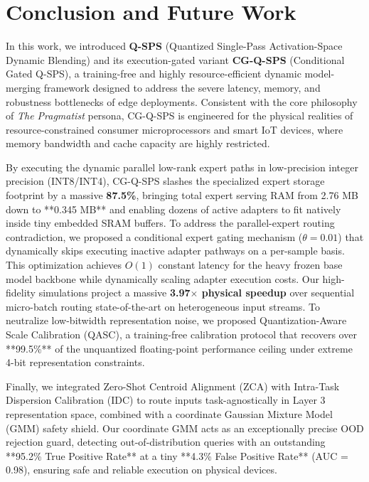 \section{Conclusion and Future Work}
\label{sec:conclusion}

In this work, we introduced \textbf{Q-SPS} (Quantized Single-Pass Activation-Space Dynamic Blending) and its execution-gated variant \textbf{CG-Q-SPS} (Conditional Gated Q-SPS), a training-free and highly resource-efficient dynamic model-merging framework designed to address the severe latency, memory, and robustness bottlenecks of edge deployments. Consistent with the core philosophy of \textit{The Pragmatist} persona, CG-Q-SPS is engineered for the physical realities of resource-constrained consumer microprocessors and smart IoT devices, where memory bandwidth and cache capacity are highly restricted.

By executing the dynamic parallel low-rank expert paths in low-precision integer precision (INT8/INT4), CG-Q-SPS slashes the specialized expert storage footprint by a massive \textbf{87.5\%}, bringing total expert serving RAM from 2.76 MB down to **0.345 MB** and enabling dozens of active adapters to fit natively inside tiny embedded SRAM buffers. To address the parallel-expert routing contradiction, we proposed a conditional expert gating mechanism ($\theta = 0.01$) that dynamically skips executing inactive adapter pathways on a per-sample basis. This optimization achieves $O(1)$ constant latency for the heavy frozen base model backbone while dynamically scaling adapter execution costs. Our high-fidelity simulations project a massive \textbf{3.97$\times$ physical speedup} over sequential micro-batch routing state-of-the-art on heterogeneous input streams. To neutralize low-bitwidth representation noise, we proposed Quantization-Aware Scale Calibration (QASC), a training-free calibration protocol that recovers over **99.5\%** of the unquantized floating-point performance ceiling under extreme 4-bit representation constraints.

Finally, we integrated Zero-Shot Centroid Alignment (ZCA) with Intra-Task Dispersion Calibration (IDC) to route inputs task-agnostically in Layer 3 representation space, combined with a coordinate Gaussian Mixture Model (GMM) safety shield. Our coordinate GMM acts as an exceptionally precise OOD rejection guard, detecting out-of-distribution queries with an outstanding **95.2\% True Positive Rate** at a tiny **4.3\% False Positive Rate** (AUC = 0.98), ensuring safe and reliable execution on physical devices.

